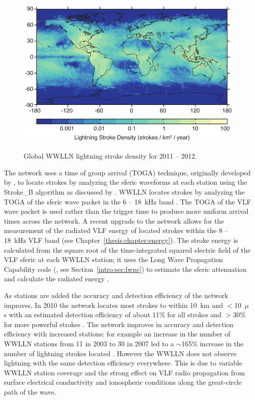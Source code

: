 \begin{figure}[ht!]
	\centering
	\includegraphics[scale=1]{Introduction/Figures/wwlln_density.pdf}\\
	\caption{Global WWLLN lightning stroke density for 2011 -- 2012.}
	\label{intro:fig:wwlln}
\end{figure}

The network uses a time of group arrival (TOGA) technique, originally developed by \citet{Dowden2002d}, to locate strokes by analyzing the sferic waveforms at each station using the Stroke\_B algorithm as discussed by \citet{Rodger2006,Rodger2009}.
WWLLN locates strokes by analyzing the TOGA of the sferic wave packet in the 6 -- 18~kHz band \citep{Dowden2000}.
The TOGA of the VLF wave packet is used rather than the trigger time to produce more uniform arrival times across the network.
A recent upgrade to the network allows for the measurement of the radiated VLF energy of located strokes within the 8 -- 18~kHz VLF band (see Chapter~\ref{thesis:chapter:energy}).
The stroke energy is calculated from the square root of the time-integrated squared electric field of the VLF sferic at each WWLLN station; it uses the Long Wave Propagation Capability code (\citet{Ferguson1998}, see Section~\ref{intro:sec:lwpc}) to estimate the sferic attenuation and calculate the radiated energy \citep{Hutchins2012}.

As stations are added the accuracy and detection efficiency of the network improves.
In 2010 the network locates most strokes to within 10~km and $<$10~$\mu$s with an estimated detection efficiency of about 11\% for all strokes and $>$30\% for more powerful strokes \citep{Abarca2010,Rodger2009}.
The network improves in accuracy and detection efficiency with increased stations; for example an increase in the number of WWLLN stations from 11 in 2003 to 30 in 2007 led to a $\sim$165\% increase in the number of lightning strokes located \citep{Rodger2009}.
However the WWLLN does not observe lightning with the same detection efficiency everywhere.
This is due to variable WWLLN station coverage and the strong effect on VLF radio propagation from surface electrical conductivity and ionospheric conditions along the great-circle path of the wave.

